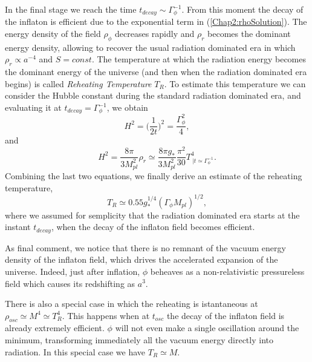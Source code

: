 \documentclass[11pt,a4paper,twoside]{book}
\begin{document}
In the final stage we reach the time $ t_{decay} \sim \Gamma^{-1}_{\phi} $. From this moment the decay of the inflaton is efficient due to the exponential term in (\ref{Chap2:rhoSolution}). The energy density of the field $\rho_{\phi}$ decreases rapidly and $\rho_{r}$ becomes the dominant energy density, allowing to recover the usual radiation dominated era in which $ \rho_{r} \propto a^{-4} $ and $ S=const $. The temperature at which the radiation energy becomes the dominant energy of the universe (and then when the radiation dominated era begins) is called \textit{Reheating Temperature} $ T_{R} $. To estimate this temperature we can consider the Hubble constant during the standard radiation dominated era, and evaluating it at $ t_{decay}=\Gamma_{\phi}^{-1} $, we obtain
\begin{equation}
	\label{HubbleConstant}
	H^{2} = \Big (\frac{1}{2t}\Big)^{2} = \frac{\Gamma_{\phi}^{2}}{4} ,
\end{equation}
and
\begin{equation}
	H^{2}=\frac{8\pi }{3M_{pl}^{2}}\rho_{r}\simeq \frac{8 \pi g_{*}}{3M_{pl}^{2}}\frac{\pi^{2}}{30}T^{4}_{\ |t\simeq \Gamma_{\phi}^{-1}}.
\end{equation}
Combining the last two equations, we finally derive an estimate of the reheating temperature,
\begin{equation}
	\label{Chap2:reheatingTemperature}
	T_{R} \simeq 0.55g_{*}^{1/4}(\Gamma_{\phi}M_{pl})^{1/2},
\end{equation}
where we assumed for semplicity that the radiation dominated era starts at the instant $ t_{decay} $, when the decay of the inflaton field becomes efficient.
 
As final comment, we notice that there is no remnant of the vacuum energy density of the inflaton field, which drives the accelerated expansion of the universe. Indeed, just after inflation, $\phi$ beheaves as a non-relativistic pressureless field which causes its redshifting as $ a^{3} $.

There is also a special case in which the reheating is istantaneous at $ \rho_{osc} \simeq M^{4} \simeq T^{4}_{R} $. This happens when at $ t_{osc} $ the decay of the inflaton field is already extremely efficient. $\phi$ will not even make a single oscillation around the minimum, transforming immediately all the vacuum energy directly into radiation. In this special case we have $ T_{R} \simeq M $.
\end{document}
